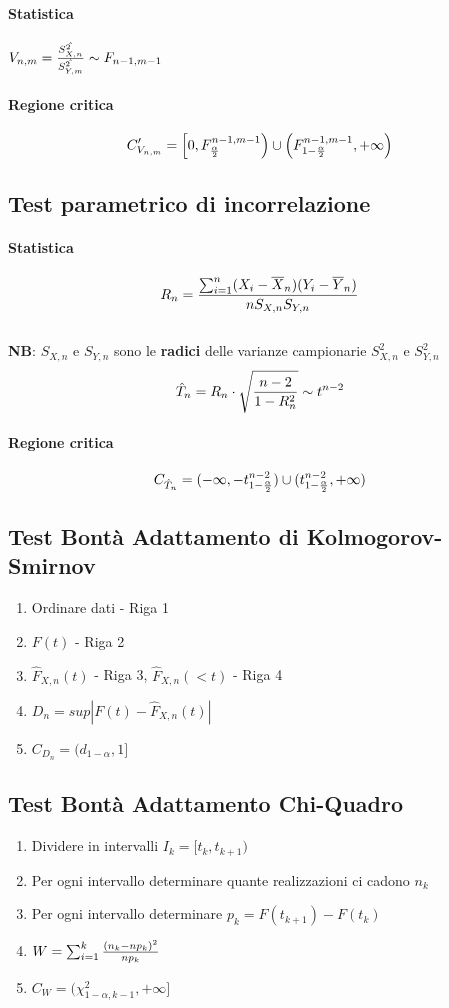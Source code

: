 \documentclass[12pt]{article}
\begin{document}
    \paragraph{Statistica} $V_{n, m} = {\hat{S^2_{X,n}} \over \hat{S^2_{Y,m}}} \sim F_{n-1, m-1}$
    \paragraph{Regione critica}
    $$C_{V_{n,m}}' = \left[0, F_{\alpha \over 2}^{n-1,m-1} \right) \cup \left(F_{1 - {\alpha \over 2}}^{n-1,m-1}, +\infty\right)$$ 

    \subsection{Test parametrico di incorrelazione }
    \paragraph{Statistica} $$R_n = {{\sum_{i=1}^n(X_i - \overline{X}_n)(Y_i - \overline{Y}_n)}\over{nS_{X,n}S_{Y,n}}}$$
    \\\textbf{NB}: $S_{X,n}$ e $S_{Y,n}$ sono le \textbf{radici} delle varianze campionarie $S_{X,n}^2$ e $S_{Y,n}^2$
    $$\hat{T}_n = R_n \cdot \sqrt{{n-2}\over{1- R_n^2}} \sim t^{n-2}$$
    \paragraph{Regione critica}
    $$C_{\hat{T}_n} = (-\infty, -t_{1-{\alpha \over 2}}^{n-2}) \cup (t_{1-{\alpha \over 2}}^{n-2}, +\infty)$$

    \newpage
    \subsection{Test Bontà Adattamento di Kolmogorov-Smirnov}
    \begin{enumerate}
        \item Ordinare dati - Riga 1
        \item $F(t)$ - Riga 2
        \item $\hat{F}_{X, n}(t)$ - Riga 3, $\hat{F}_{X, n}(< t)$ - Riga 4
        \item $D_n = sup|F(t) - \hat{F}_{X, n}(t)|$
        \item $C_{D_n} = (d_{1-\alpha}, 1]$
    \end{enumerate}
    \subsection{Test Bontà Adattamento Chi-Quadro}
    \begin{enumerate}
        \item Dividere in intervalli $I_k = [t_k, t_{k+1})$
        \item Per ogni intervallo determinare quante realizzazioni ci cadono $n_k$
        \item Per ogni intervallo determinare $p_k = F(t_{k+1}) - F(t_k)$
        \item $W = \sum_{i=1}^k {{(n_k - np_k)^2}\over{np_k}}$
        \item $C_{W} = (\chi^2_{1-\alpha, k-1}, +\infty]$
    \end{enumerate}
\end{document}
